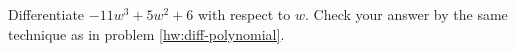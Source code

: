 Differentiate $-11w^3+5w^2+6$ with respect to $w$. Check your answer by the same
technique as in problem \ref{hw:diff-polynomial}.
\answercheck
